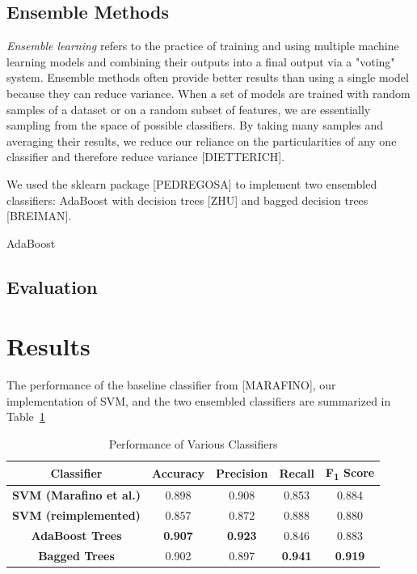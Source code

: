 \documentclass[conference]{IEEEtran}
\begin{document}
\subsection{Ensemble Methods}\label{AA}
\textit{Ensemble learning} refers to the practice of training and using multiple machine learning models and combining their outputs into a final output via a "voting" system. Ensemble methods often provide better results than using a single model because they can reduce variance. When a set of models are trained with random samples of a dataset or on a random subset of features, we are essentially sampling from the space of possible classifiers. By taking many samples and averaging their results, we reduce our reliance on the particularities of any one classifier and therefore reduce variance [DIETTERICH].

We used the sklearn package [PEDREGOSA] to implement two ensembled classifiers: AdaBoost with decision trees [ZHU] and bagged decision trees [BREIMAN]. 

AdaBoost 
\subsection{Evaluation}\label{AA}

\section{Results}
The performance of the baseline classifier from [MARAFINO], our implementation of SVM, and the two ensembled classifiers are summarized in Table~\ref{restab}
\begin{table}[htbp]
\caption{Performance of Various Classifiers}
\begin{center}
\begin{tabular}{ccccc}
\textbf{Classifier}&\textbf{Accuracy}&\textbf{Precision}&\textbf{Recall}&\textbf{F\textsubscript{1} Score} \\
\hline
\textbf{SVM (Marafino et al.)} & 0.898 & 0.908 & 0.853 & 0.884 \\
\textbf{SVM (reimplemented)} & 0.857 & 0.872 & 0.888 & 0.880 \\
\textbf{AdaBoost Trees} & \textbf{0.907} & \textbf{0.923} & 0.846 & 0.883 \\
\textbf{Bagged Trees} & 0.902 & 0.897 & \textbf{0.941} & \textbf{0.919} \\

\end{tabular}
\label{restab}
\end{center}
\end{table}
\end{document}
